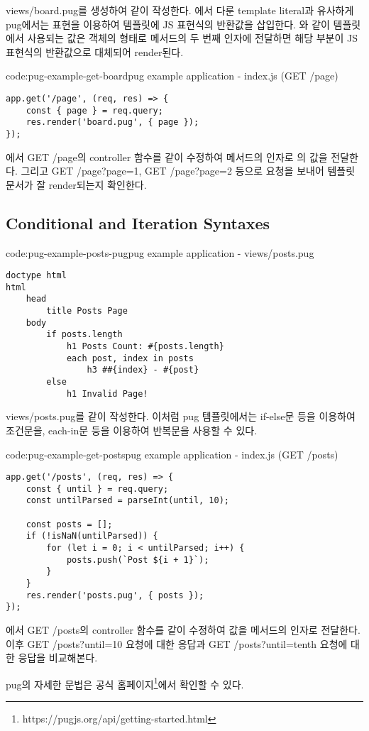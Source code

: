 views/board.pug를 생성하여 \와 같이 작성한다. 에서 다룬 template literal과 유사하게 pug에서는 \cd{\#\{\}} 표현을 이용하여 템플릿에 JS 표현식의 반환값을 삽입한다. 와 같이 템플릿에서 사용되는 값은 객체의 형태로  메서드의 두 번째 인자에 전달하면 해당 부분이 JS 표현식의 반환값으로 대체되어 render된다.

\begin{code}{code:pug-example-get-board}{pug example application - index.js (GET /page)}
\begin{verbatim}
app.get('/page', (req, res) => {
    const { page } = req.query;
    res.render('board.pug', { page });
});
\end{verbatim}
\end{code}

에서 GET /page의 controller 함수를 \와 같이 수정하여  메서드의 인자로 의 값을 전달한다. 그리고 GET /page?page=1, GET /page?page=2 등으로 요청을 보내어 템플릿 문서가 잘 render되는지 확인한다.

\subsection*{Conditional and Iteration Syntaxes}

\begin{code}{code:pug-example-posts-pug}{pug example application - views/posts.pug}
\begin{verbatim}
doctype html
html
    head
        title Posts Page
    body
        if posts.length
            h1 Posts Count: #{posts.length}
            each post, index in posts
                h3 ##{index} - #{post}
        else
            h1 Invalid Page!
\end{verbatim}
\end{code}

views/posts.pug를 \와 같이 작성한다. 이처럼 pug 템플릿에서는 if-else문 등을 이용하여 조건문을, each-in문 등을 이용하여 반복문을 사용할 수 있다.

\begin{code}{code:pug-example-get-posts}{pug example application - index.js (GET /posts)}
\begin{verbatim}
app.get('/posts', (req, res) => {
    const { until } = req.query;
    const untilParsed = parseInt(until, 10);

    const posts = [];
    if (!isNaN(untilParsed)) {
        for (let i = 0; i < untilParsed; i++) {
            posts.push(`Post ${i + 1}`);
        }
    }
    res.render('posts.pug', { posts });
});
\end{verbatim}
\end{code}

에서 GET /posts의 controller 함수를 \와 같이 수정하여  값을  메서드의 인자로 전달한다. 이후 GET /posts?until=10 요청에 대한 응답과 GET /posts?until=tenth 요청에 대한 응답을 비교해본다.

pug의 자세한 문법은 공식 홈페이지\footnote{https://pugjs.org/api/getting-started.html}에서 확인할 수 있다.
